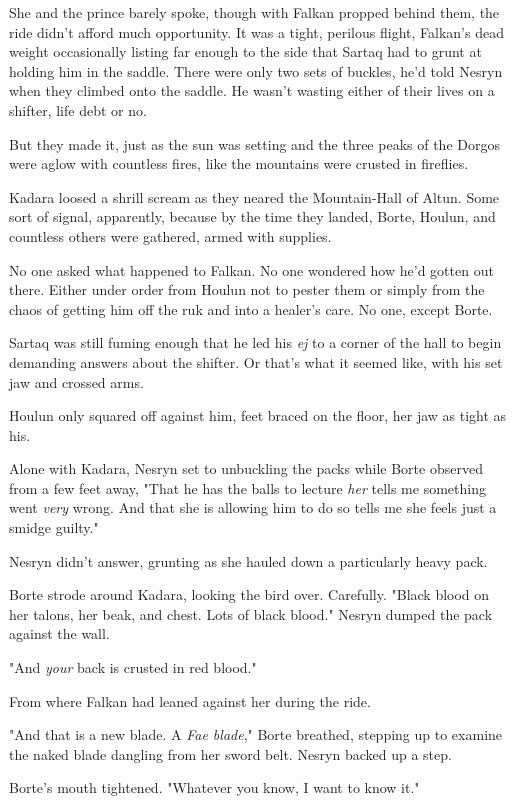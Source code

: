 She and the prince barely spoke, though with Falkan propped behind them, the ride didn't afford much opportunity. It was a tight, perilous flight, Falkan's dead weight occasionally listing far enough to the side that Sartaq had to grunt at holding him in the saddle. There were only two sets of buckles, he'd told Nesryn when they climbed onto the saddle. He wasn't wasting either of their lives on a shifter, life debt or no.

But they made it, just as the sun was setting and the three peaks of the Dorgos were aglow with countless fires, like the mountains were crusted in fireflies.

Kadara loosed a shrill scream as they neared the Mountain-Hall of Altun. Some sort of signal, apparently, because by the time they landed, Borte, Houlun, and countless others were gathered, armed with supplies.

No one asked what happened to Falkan. No one wondered how he'd gotten out there. Either under order from Houlun not to pester them or simply from the chaos of getting him off the ruk and into a healer's care. No one, except Borte.

Sartaq was still fuming enough that he led his \emph{ej} to a corner of the hall to begin demanding answers about the shifter. Or that's what it seemed like, with his set jaw and crossed arms.

Houlun only squared off against him, feet braced on the floor, her jaw as tight as his.

Alone with Kadara, Nesryn set to unbuckling the packs while Borte observed from a few feet away, "That he has the balls to lecture
\emph{her} tells me something went \emph{very} wrong. And that she is allowing him to do so tells me she feels just a smidge guilty."

Nesryn didn't answer, grunting as she hauled down a particularly heavy pack.

Borte strode around Kadara, looking the bird over. Carefully. "Black blood on her talons, her beak, and chest. Lots of black blood." Nesryn dumped the pack against the wall.

"And \emph{your} back is crusted in red blood."

From where Falkan had leaned against her during the ride.

"And that is a new blade. A \emph{Fae blade}," Borte breathed, stepping up to examine the naked blade dangling from her sword belt. Nesryn backed up a step.

Borte's mouth tightened. "Whatever you know, I want to know it."

